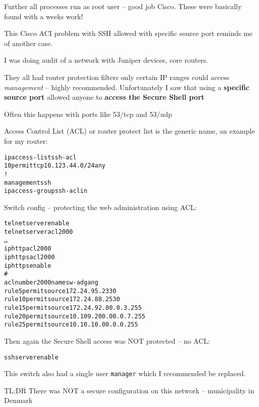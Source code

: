 \documentclass[Screen16to9,17pt]{foils}
\begin{document}
\vskip 5mm
Further all processes run as root user -- good job Cisco. These were basically found with a weeks work!


This Cisco ACI problem with SSH allowed with specific source port reminds me of another case.

I was doing audit of a network with Juniper devices, core routers.

They all had router protection filters only certain IP ranges could access \emph{management} -- highly recommended. Unfortunately I saw that using a {\bf specific source port} allowed anyone to {\bf access the Secure Shell port}

\vskip 20mm
\begin{list2}
\item Often this happens with ports like 53/tcp and 53/udp
\end{list2}

Access Control List (ACL) or router protect list is the generic name, an example for my router:
\begin{alltt}\small
ip access-list ssh-acl
   10 permit tcp 10.123.44.0/24 any
!
management ssh
   ip access-group ssh-acl in
\end{alltt}






Switch config -- protecting the web administration using ACL:
\begin{alltt}\scriptsize
telnet server enable
telnet server acl 2000
…
ip http acl 2000
ip https acl 2000
ip https enable
#
acl number 2000 name sw-adgang
rule 5 permit source 172.24.95.233 0
rule 10 permit source 172.24.88.253 0
rule 15 permit source 172.24.92.0 0.0.3.255
rule 20 permit source 10.109.200.0 0.0.7.255
rule 25 permit source 10.10.10.0 0.0.0.255
\end{alltt}

Then again the Secure Shell access was NOT protected -- no ACL:
\begin{alltt}\scriptsize
ssh server enable
\end{alltt}

This switch also had a single user \verb+manager+ which I recommended be replaced.

TL;DR There was NOT a secure configuration on this network -- municipality in Denmark
\end{document}
